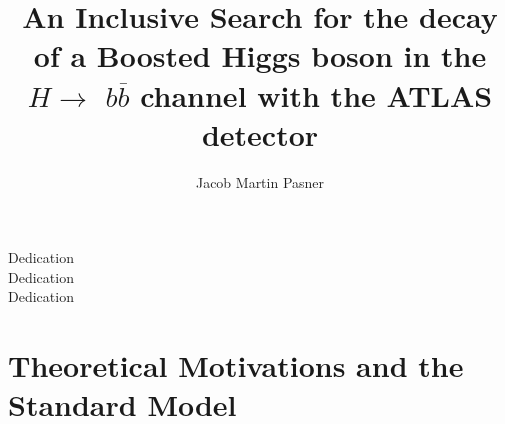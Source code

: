 \documentclass[11pt]{ucthesis}
\begin{document}

\title{An Inclusive Search for the decay of a Boosted Higgs boson in the $H
\rightarrow$ \MakeLowercase{$b\overline{b}$} channel with the ATLAS detector}
\author{Jacob Martin Pasner}
\deanlinethree{}

\begin{frontmatter}

\maketitle
\copyrightpage

\tableofcontents
\listoffigures
\listoftables

\begin{abstract}



\end{abstract}

\begin{dedication}
\null\vfil
{\large
\begin{center}
Dedication\\\vspace{12pt}
Dedication\\\vspace{12pt}
Dedication
\end{center}}
\vfil\null
\end{dedication}


\begin{acknowledgements}



\end{acknowledgements}

\end{frontmatter}




\part{Theoretical Motivations and the Standard Model}
\end{document}

